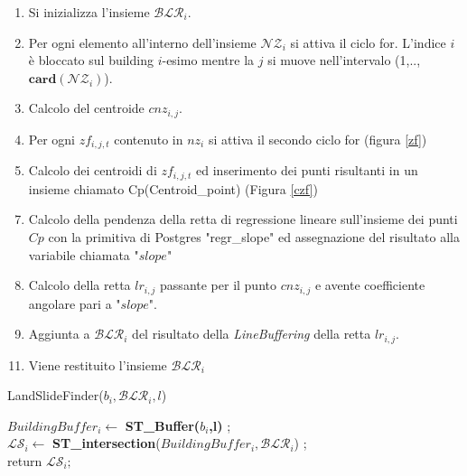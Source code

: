 \begin{enumerate}
	\item Si inizializza l'insieme $\mathcal{BLR}_i$.
	\item Per ogni elemento all'interno dell'insieme $\mathcal{NZ}_i$ si attiva il ciclo for. L'indice $i$ è bloccato sul building $i$-esimo mentre la $j$ si muove nell'intervalo (1,..,$\mathbf{card}(\mathcal{NZ}_i)$).
	\item Calcolo del centroide $cnz_{i,j}$.
	\item Per ogni $zf_{i,j,t}$ contenuto in $nz_i$ si attiva il secondo ciclo for (figura \ref{zf}) 
	\item Calcolo dei centroidi di $zf_{i,j,t}$ ed inserimento dei punti risultanti in un insieme chiamato Cp(Centroid\_point) (Figura \ref{czf})
\end{enumerate}
\begin{enumerate}
	\setcounter{enumi}{6}
	\item Calcolo della pendenza della retta di regressione lineare sull'insieme dei punti $Cp$ con la primitiva di Postgres "regr\_slope" ed assegnazione del risultato alla variabile chiamata "$slope$"
	\item Calcolo della retta $lr_{i,j}$ passante per il punto $cnz_{i,j}$ e avente coefficiente angolare pari a "$slope$".
	\item Aggiunta a $\mathcal{BLR}_i$ del risultato della \textit{LineBuffering} della retta $lr_{i,j}$.
\end{enumerate}
\begin{enumerate}
	\setcounter{enumi}{10}
	\item Viene restituito l'insieme $\mathcal{BLR}_i$
\end{enumerate}


\begin{algorithm}[H]
	
	\IncMargin{1em}
	\caption{LandSlideFinder($b_i , \mathcal{BLR}_i, l$) }
	\label{alg:four}
	\BlankLine
	\SetAlgoNoLine
	$ BuildingBuffer_i  \leftarrow $ \textbf{ST\_Buffer($b_i$,l)} ;\\
	$ \mathcal{LS}_i \leftarrow $ \textbf{ST\_intersection}($BuildingBuffer_i,\mathcal{BLR}_i $) ;\\
	return $\mathcal{LS}_i;$
\end{algorithm}

